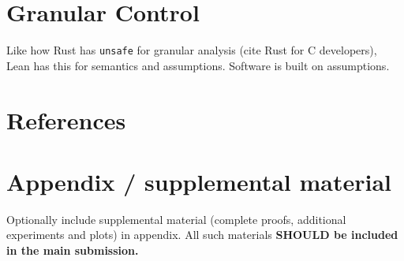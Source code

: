 \documentclass{article}
\begin{document}
\section{Granular Control}
Like how Rust has \texttt{unsafe} for granular analysis (cite Rust for C developers),
Lean has this for semantics and assumptions. Software is built on assumptions.

\begin{ack}
\end{ack}

\section*{References}

{
  \small
}

\appendix

\section{Appendix / supplemental material}

Optionally include supplemental material (complete proofs, additional experiments and plots) in appendix.
All such materials \textbf{SHOULD be included in the main submission.}
\end{document}
